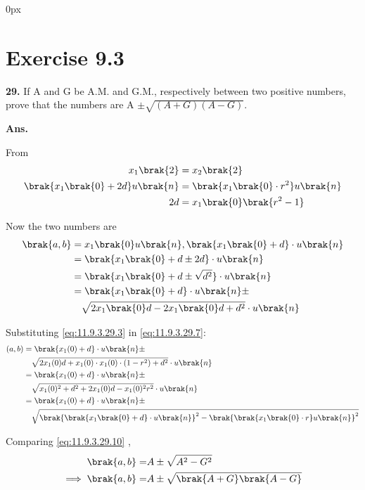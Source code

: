 \documentclass[journal,12pt,twocolumn]{IEEEtran}
\begin{document}
\parindent 0px


\vspace{3cm}

\title{}
\author{EE23BTECH11042 -  Khusinadha Naik$^{*}$
}
\maketitle
\newpage
\bigskip



\section*{Exercise 9.3}

\noindent \textbf{29.} \hspace{2pt}If A and G be A.M. and G.M., respectively between two positive numbers, prove that the numbers are A $\pm \sqrt{(A+G)(A-G)}$. 

\noindent \textbf{Ans.}\\

\begin{table}[h]

\end{table}

\noindent From 
\begin{align}
x_1\brak{2} &= x_2\brak{2} \\
\brak{x_1\brak{0} + 2d }u\brak{n} &= \brak{x_1\brak{0}\cdot r^{2}}u\brak{n} \\
2d &= x_1\brak{0}\brak{r^{2} - 1}  \label{eq:11.9.3.29.3}
\end{align}

Now the two numbers are 
\begin{align}
\brak{a,b} &= x_1\brak{0}u\brak{n} , \brak{x_1\brak{0} + d}\cdot u\brak{n} \\
&=\brak{x_1\brak{0} + d \pm 2d}\cdot u\brak{n} \\
&=\brak{x_1\brak{0} + d \pm \sqrt{d^{2}}}\cdot u\brak{n} \\
\notag &=\brak{x_1\brak{0} + d }\cdot u\brak{n}\pm\\
& \quad  \sqrt{2x_1\brak{0}d - 2x_1\brak{0}d + d^{2}}\cdot  u\brak{n} \label{eq:11.9.3.29.7}
\end{align}

Substituting \eqref{eq:11.9.3.29.3} in \eqref{eq:11.9.3.29.7}:
\begin{align}
\notag (a,b) &= \brak{x_1(0) + d }\cdot u\brak{n}\pm \\ 
& \quad \sqrt{2x_1(0)d + x_1(0) \cdot x_1(0) \cdot (1 - r^{2}) + d^{2}}\cdot u\brak{n} \\
\notag &= \brak{x_1(0) + d }\cdot u\brak{n}\pm \\ 
& \quad \sqrt{x_1(0)^2 + d^2 + 2x_1(0)d - x_1(0)^2r^2}\cdot u\brak{n} \\
\notag &= \brak{x_1(0) + d }\cdot u\brak{n}\pm \\
& \quad \sqrt{ \brak{\brak{x_1\brak{0} + d}\cdot u\brak{n}}^2 - \brak{\brak{x_1\brak{0}\cdot r}u\brak{n}}^2}\label{eq:11.9.3.29.10}
\end{align}
\pagebreak

\noindent Comparing \eqref{eq:11.9.3.29.10} ,  
\begin{align}
\brak{a,b} =& A \pm \sqrt{A^2 - G^2} \\
\implies \brak{a,b} =& A \pm \sqrt{\brak{A + G}\brak{A - G}}
\end{align}
\end{document}
